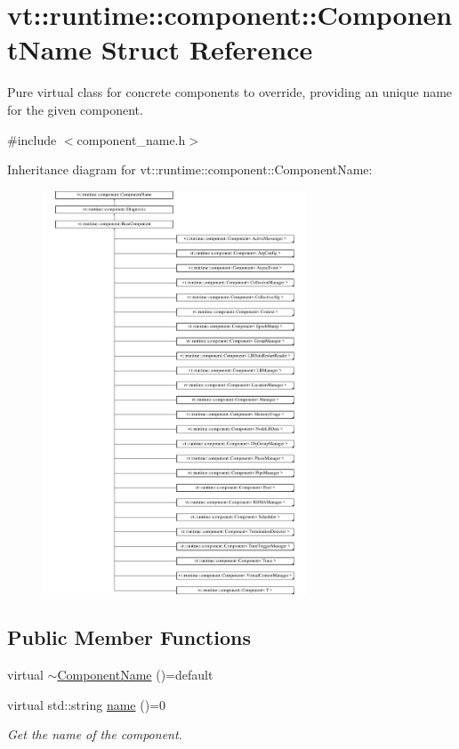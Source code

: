 \hypertarget{structvt_1_1runtime_1_1component_1_1_component_name}{}\section{vt\+:\+:runtime\+:\+:component\+:\+:Component\+Name Struct Reference}
\label{structvt_1_1runtime_1_1component_1_1_component_name}


Pure virtual class for concrete components to override, providing an unique name for the given component.  




{\ttfamily \#include $<$component\+\_\+name.\+h$>$}

Inheritance diagram for vt\+:\+:runtime\+:\+:component\+:\+:Component\+Name\+:\begin{figure}[H]
\begin{center}
\leavevmode
\includegraphics[height=12.000000cm]{structvt_1_1runtime_1_1component_1_1_component_name}
\end{center}
\end{figure}
\subsection*{Public Member Functions}
\begin{DoxyCompactItemize}
\item 
virtual \hyperlink{structvt_1_1runtime_1_1component_1_1_component_name_a3b826c5eee9d015afd67d9b8353aac30}{$\sim$\+Component\+Name} ()=default
\item 
virtual std\+::string \hyperlink{structvt_1_1runtime_1_1component_1_1_component_name_a33c06229bb605a2b2ceff68830d6d773}{name} ()=0
\begin{DoxyCompactList}\small\item\em Get the name of the component. \end{DoxyCompactList}\end{DoxyCompactItemize}


